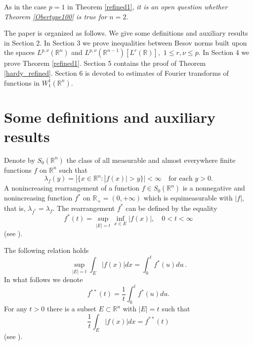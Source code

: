 \documentclass[12pt,twoside,reqno]{amsart}
\numberwithin{equation}{section}
\theoremstyle{definition}
\numberwithin{equation}{section}
\def\R{\mathbb{R}}
\begin{document}
As in the case $p=1$ in Theorem \ref{refined1}, {{\it it is an open
question whether Theorem \ref{Obertype100} is true for $n=2.$}}
\vskip 4pt

The paper is organized as follows. We give some definitions and auxiliary results in Section 2.
In Section 3 we prove inequalities between Besov norms built upon the spaces $L^{p,\nu}(\R^n)$ and $L^{p,\nu}(\R^{n-1})[L^r(\R)],$ $1\le r, \nu\le p$. In Section 4 we prove Theorem \ref{refined1}.  Section 5 contains the proof of  Theorem \ref{hardy_refined}.   Section 6 is devoted to estimates of Fourier transforms of functions in $W_1^1(\R^n).$





\section{Some definitions and auxiliary results}

 Denote by $S_0(\mathbb{R}^n)$ the class of all measurable and
almost everywhere finite functions $f$ on $\mathbb{R}^n$ such that
\begin{equation*}
\lambda_f (y) = | \{x \in \mathbb{R}^n : |f(x)|>y \}| <
\infty\quad \text{for each $y>0$}.
\end{equation*}
A nonincreasing rearrangement of a function $f \in
S_0(\mathbb{R}^n)$ is a nonnegative and nonincreasing function $f^*$ on
$\mathbb{R}_+ = (0, + \infty)$ which is equimeasurable with $|f|$, that is, $\lambda_{f^*}=\lambda_f.$
The rearrangement $f^*$ can be defined by the equality
\begin{equation}\label{rearrangement}
f^*(t) = \sup_{|E|=t} \inf_{x \in E} |f(x)|,\quad 0<t<\infty
\end{equation}
(see \cite[p. 32]{ChR}).



The following relation holds \cite[p. 53]{BS}
\begin{equation} \label{supremum}
\sup_{|E|=t} \int_E |f(x)| dx = \int_0^t f^*(u) du \,.
\end{equation}
In what follows we denote
\begin{equation}\label{def**}
f^{**}(t)= \frac{1}{t} \int_0^t f^*(u) du.
\end{equation}
For any $t>0$ there is a subset $E\subset \R^n$ with $|E|=t$ such that
\begin{equation} \label{supremum2}
\frac{1}{t} \int_E|f(x)|dx=f^{**}(t)
\end{equation}
(see \cite[p. 53]{BS}).
\end{document}
